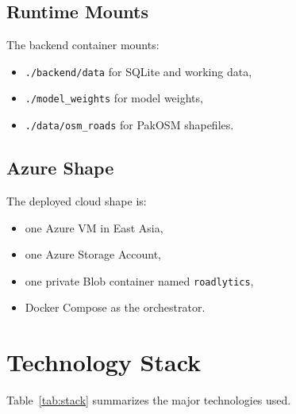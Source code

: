\documentclass[conference]{IEEEtran}
\begin{document}
\subsection{Runtime Mounts}
The backend container mounts:

\begin{itemize}[leftmargin=16pt]
\item \texttt{./backend/data} for SQLite and working data,
\item \texttt{./model\_weights} for model weights,
\item \texttt{./data/osm\_roads} for PakOSM shapefiles.
\end{itemize}

\subsection{Azure Shape}
The deployed cloud shape is:

\begin{itemize}[leftmargin=16pt]
\item one Azure VM in East Asia,
\item one Azure Storage Account,
\item one private Blob container named \texttt{roadlytics},
\item Docker Compose as the orchestrator.
\end{itemize}

\section{Technology Stack}
Table~\ref{tab:stack} summarizes the major technologies used.
\end{document}
